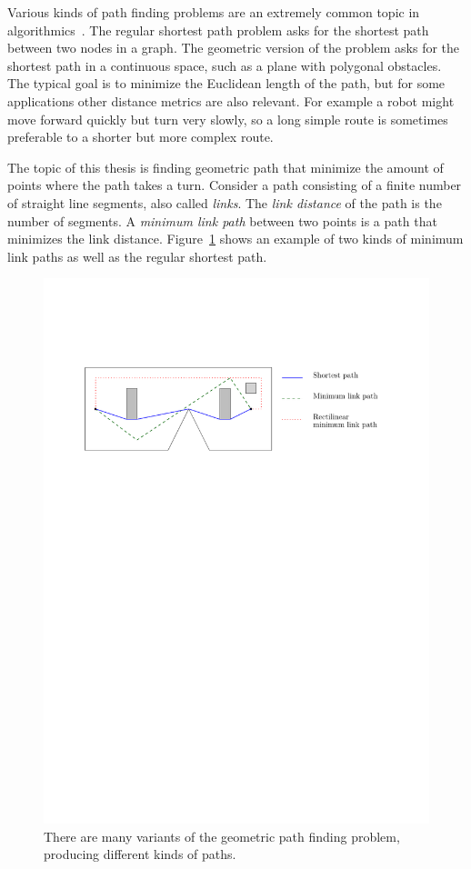 \documentclass[english,gradu]{tktltiki2018}
\begin{document}
Various kinds of path finding problems are an extremely common topic in algorithmics~\cite{survey}.
The regular shortest path problem asks for the shortest path between two nodes in a graph.
The geometric version of the problem asks for the shortest path in a continuous space, such as a plane with polygonal obstacles.
The typical goal is to minimize the Euclidean length of the path, but for some applications other distance metrics are also relevant.
For example a robot might move forward quickly but turn very slowly, so a long simple route is sometimes preferable to a shorter but more complex route.

The topic of this thesis is finding geometric path that minimize the amount of points where the path takes a turn.
Consider a path consisting of a finite number of straight line segments, also called \emph{links}.
The \emph{link distance} of the path is the number of segments.
A \emph{minimum link path} between two points is a path that minimizes the link distance.
Figure~\ref{fig:paths} shows an example of two kinds of minimum link paths as well as the regular shortest path.

\begin{figure}\centering
	\includegraphics[width=\textwidth]{fig/paths}
	\caption{There are many variants of the geometric path finding problem, producing different kinds of paths.}\label{fig:paths}
\end{figure}
\end{document}
